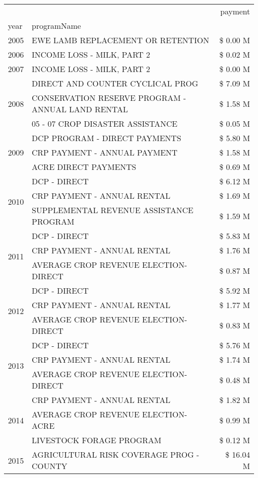 \begin{tabular}{llr}
\toprule
 &  & payment \\
year & programName &  \\
\midrule
2005 & EWE LAMB REPLACEMENT OR RETENTION & \$ 0.00 M \\
\cline{1-3}
2006 & INCOME LOSS - MILK, PART 2 & \$ 0.02 M \\
\cline{1-3}
2007 & INCOME LOSS - MILK, PART 2 & \$ 0.00 M \\
\cline{1-3}
\multirow[t]{3}{*}{2008} & DIRECT AND COUNTER CYCLICAL PROG & \$ 7.09 M \\
 & CONSERVATION RESERVE PROGRAM - ANNUAL LAND RENTAL & \$ 1.58 M \\
 & 05 - 07 CROP DISASTER ASSISTANCE & \$ 0.05 M \\
\cline{1-3}
\multirow[t]{3}{*}{2009} & DCP PROGRAM - DIRECT PAYMENTS & \$ 5.80 M \\
 & CRP PAYMENT - ANNUAL PAYMENT & \$ 1.58 M \\
 & ACRE DIRECT PAYMENTS & \$ 0.69 M \\
\cline{1-3}
\multirow[t]{3}{*}{2010} & DCP - DIRECT & \$ 6.12 M \\
 & CRP PAYMENT - ANNUAL RENTAL & \$ 1.69 M \\
 & SUPPLEMENTAL REVENUE ASSISTANCE PROGRAM & \$ 1.59 M \\
\cline{1-3}
\multirow[t]{3}{*}{2011} & DCP - DIRECT & \$ 5.83 M \\
 & CRP PAYMENT - ANNUAL RENTAL & \$ 1.76 M \\
 & AVERAGE CROP REVENUE ELECTION-DIRECT & \$ 0.87 M \\
\cline{1-3}
\multirow[t]{3}{*}{2012} & DCP - DIRECT & \$ 5.92 M \\
 & CRP PAYMENT - ANNUAL RENTAL & \$ 1.77 M \\
 & AVERAGE CROP REVENUE ELECTION-DIRECT & \$ 0.83 M \\
\cline{1-3}
\multirow[t]{3}{*}{2013} & DCP - DIRECT & \$ 5.76 M \\
 & CRP PAYMENT - ANNUAL RENTAL & \$ 1.74 M \\
 & AVERAGE CROP REVENUE ELECTION-DIRECT & \$ 0.48 M \\
\cline{1-3}
\multirow[t]{3}{*}{2014} & CRP PAYMENT - ANNUAL RENTAL & \$ 1.82 M \\
 & AVERAGE CROP REVENUE ELECTION-ACRE & \$ 0.99 M \\
 & LIVESTOCK FORAGE PROGRAM & \$ 0.12 M \\
\cline{1-3}
\multirow[t]{3}{*}{2015} & AGRICULTURAL RISK COVERAGE PROG - COUNTY & \$ 16.04 M \\

\end{tabular}
